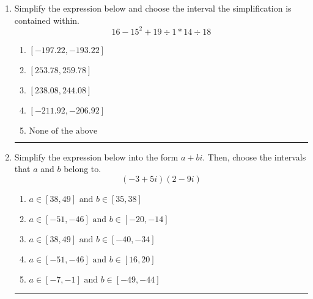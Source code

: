 \documentclass[14pt]{extbook}
\newcommand{\litem}[1]{\item#1\hspace*{-1cm}\rule{\textwidth}{0.4pt}}
\begin{document}
\begin{enumerate}
{\begin{enumerate}[label=\Alph*.]
\end{enumerate} }
\litem{
Simplify the expression below and choose the interval the simplification is contained within.\[ 16 - 15^2 + 19 \div 1 * 14 \div 18 \]\begin{enumerate}[label=\Alph*.]
\item \( [-197.22, -193.22] \)
\item \( [253.78, 259.78] \)
\item \( [238.08, 244.08] \)
\item \( [-211.92, -206.92] \)
\item \( \text{None of the above} \)

\end{enumerate} }
\litem{
Simplify the expression below into the form $a+bi$. Then, choose the intervals that $a$ and $b$ belong to.\[ (-3 + 5 i)(2 - 9 i) \]\begin{enumerate}[label=\Alph*.]
\item \( a \in [38, 49] \text{ and } b \in [35, 38] \)
\item \( a \in [-51, -46] \text{ and } b \in [-20, -14] \)
\item \( a \in [38, 49] \text{ and } b \in [-40, -34] \)
\item \( a \in [-51, -46] \text{ and } b \in [16, 20] \)
\item \( a \in [-7, -1] \text{ and } b \in [-49, -44] \)

\end{enumerate} }
\end{enumerate}
\end{document}
